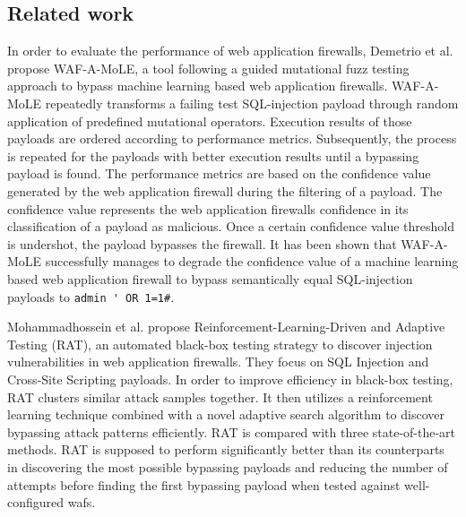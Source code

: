 \subsection{Related work}
In order to evaluate the performance of web application firewalls, Demetrio et al. \cite{rw/demetrio} propose WAF-A-MoLE, a tool following a guided mutational fuzz testing approach to bypass machine learning based web application firewalls. WAF-A-MoLE repeatedly transforms a failing test SQL-injection payload through random application of predefined mutational operators. Execution results of those payloads are ordered according to performance metrics. Subsequently, the process is repeated for the payloads with better execution results until a bypassing payload is found. The performance metrics are based on the confidence value generated by the web application firewall during the filtering of a payload. The confidence value represents the web application firewalls confidence in its classification of a payload as malicious. Once a certain confidence value threshold is undershot, the payload bypasses the firewall. It has been shown that WAF-A-MoLE successfully manages to degrade the confidence value of a machine learning based web application firewall to bypass semantically equal SQL-injection payloads to \verb|admin ' OR 1=1#|.

Mohammadhossein et al. \cite{rw/mohammad} propose Reinforcement-Learning-Driven and Adaptive Testing (RAT), an automated black-box testing strategy to discover injection vulnerabilities in web application firewalls. They focus on SQL Injection and Cross-Site Scripting payloads. In order to improve efficiency in black-box testing, RAT clusters similar attack samples together. It then utilizes a reinforcement learning technique combined with a novel adaptive search algorithm to discover bypassing attack patterns efficiently. RAT is compared with three state-of-the-art methods. RAT is supposed to perform significantly better than its counterparts in discovering the most possible bypassing payloads and reducing the number of attempts before finding the first bypassing payload when tested against well-configured \acrfull{waf}s.

